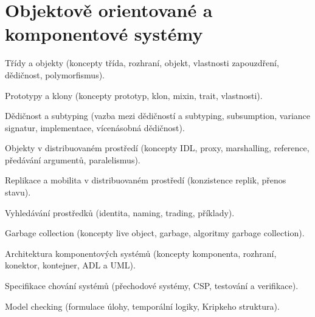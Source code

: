 \newpage
\section{Objektově orientované a komponentové systémy}
\begin{pozadavky}
\begin{pitemize}
\item Třídy a objekty (koncepty třída, rozhraní, objekt, vlastnosti zapouzdření, dědičnost, polymorfismus).
\item Prototypy a klony (koncepty prototyp, klon, mixin, trait, vlastnosti).
\item Dědičnost a subtyping (vazba mezi dědičností a subtyping, subsumption, variance signatur, implementace, vícenásobná dědičnost).
\item Objekty v distribuovaném prostředí (koncepty IDL, proxy, marshalling, reference, předávání argumentů, paralelismus).
\item Replikace a mobilita v distribuovaném prostředí (konzistence replik, přenos stavu).
\item Vyhledávání prostředků (identita, naming, trading, příklady).
\item Garbage collection (koncepty live object, garbage, algoritmy garbage collection).
\item Architektura komponentových systémů (koncepty komponenta, rozhraní, konektor, kontejner, ADL a UML).
\item Specifikace chování systémů (přechodové systémy, CSP, testování a verifikace).
\item Model checking (formulace úlohy, temporální logiky, Kripkeho struktura).
\end{pitemize}
\end{pozadavky}